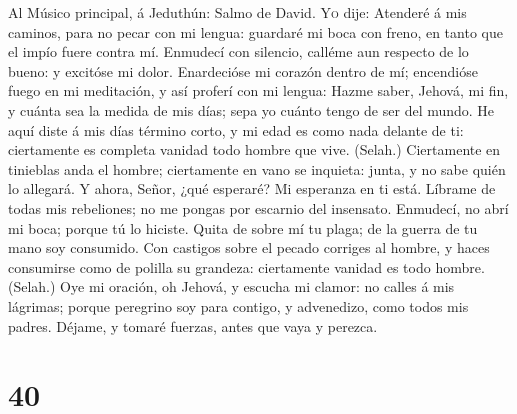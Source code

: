  Al Músico principal, á Jeduthún: Salmo de David.
\textsc{Yo} dije: Atenderé á mis caminos, para no pecar con mi lengua:
guardaré mi boca con freno, en tanto que el impío fuere contra mí.
 Enmudecí con silencio, calléme aun respecto de lo bueno:
y excitóse mi dolor.  Enardecióse mi corazón dentro de mí;
encendióse fuego en mi meditación, y así proferí con mi lengua:
 Hazme saber, Jehová, mi fin, y cuánta sea la medida de
mis días; sepa yo cuánto tengo de ser del mundo.  He aquí
diste á mis días término corto, y mi edad es como nada delante de ti:
ciertamente es completa vanidad todo hombre que vive. (Selah.)
 Ciertamente en tinieblas anda el hombre; ciertamente en
vano se inquieta: junta, y no sabe quién lo allegará.  Y
ahora, Señor, ¿qué esperaré? Mi esperanza en ti está. 
Líbrame de todas mis rebeliones; no me pongas por escarnio del
insensato.  Enmudecí, no abrí mi boca; porque tú lo
hiciste.  Quita de sobre mí tu plaga; de la guerra de tu
mano soy consumido.  Con castigos sobre el pecado
corriges al hombre, y haces consumirse como de polilla su grandeza:
ciertamente vanidad es todo hombre. (Selah.)  Oye mi
oración, oh Jehová, y escucha mi clamor: no calles á mis lágrimas;
porque peregrino soy para contigo, y advenedizo, como todos mis padres.
 Déjame, y tomaré fuerzas, antes que vaya y perezca.

\hypertarget{section-39}{%
\section{40}\label{section-39}}

